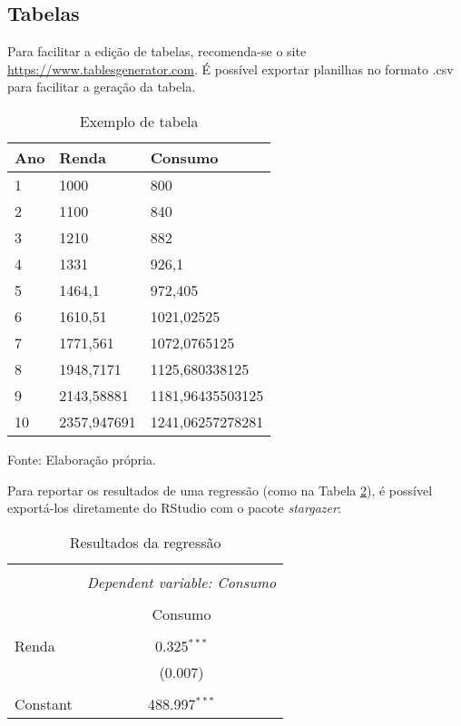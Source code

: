 \documentclass[a4paper]{article} %
\begin{document}
{\subsection{Tabelas} \label{S32}
Para facilitar a edição de tabelas, recomenda-se o site \url{https://www.tablesgenerator.com}. É possível exportar planilhas no formato .csv para facilitar a geração da tabela.
\begin{table}[H]
	\centering
	\caption{Exemplo de tabela}
	\label{T1} 
	\begin{tabular}{lll}
		\hline
		Ano & Renda       & Consumo          \\ \hline
		1   & 1000        & 800              \\
		2   & 1100        & 840              \\
		3   & 1210        & 882              \\
		4   & 1331        & 926,1            \\
		5   & 1464,1      & 972,405          \\
		6   & 1610,51     & 1021,02525       \\
		7   & 1771,561    & 1072,0765125     \\
		8   & 1948,7171   & 1125,680338125   \\
		9   & 2143,58881  & 1181,96435503125 \\
		10  & 2357,947691 & 1241,06257278281 \\
		\hline
	\end{tabular} \hspace{80mm}
	Fonte: Elaboração própria.
\end{table}
Para reportar os resultados de uma regressão (como na Tabela \ref{T2}), é possível exportá-los diretamente do RStudio com o pacote \textit{stargazer}:
\begin{table}[H] \centering 
	\caption{Resultados da regressão} 
	\label{T2} 
	\begin{tabular}{@{\extracolsep{5pt}}lc} 
		\\[-1.8ex]\hline 
		\hline \\[-1.8ex] 
		& \multicolumn{1}{c}{\textit{Dependent variable: Consumo}} \\ 
		\cline{2-2} 
		\\[-1.8ex] & Consumo \\ 
		\hline \\[-1.8ex] 
		Renda & 0.325$^{***}$ \\ 
		& (0.007) \\ 
		& \\ 
		Constant & 488.997$^{***}$ \\ 

\end{tabular}
\end{table}}
\end{document}

